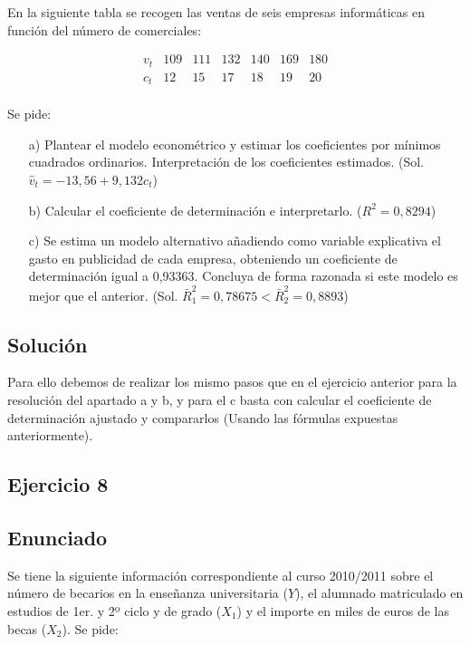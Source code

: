 \documentclass[a4paper,12pt]{article}
\begin{document}
En la siguiente tabla se recogen las ventas de seis empresas informáticas en función del número de comerciales:

\[
\begin{array}{c|cccccc}
v_t & 109 & 111 & 132 & 140 & 169 & 180 \\
\hline
c_t & 12 & 15 & 17 & 18 & 19 & 20 \\
\end{array}
\]



Se pide:

\begin{enumerate}
    \item[a)] Plantear el modelo econométrico y estimar los coeficientes por mínimos cuadrados ordinarios. Interpretación de los coeficientes estimados. (Sol. $\hat{v}_t = -13,56 + 9,132c_t$)
    \item[b)] Calcular el coeficiente de determinación e interpretarlo. ($R^2 = 0,8294$)
    \item[c)] Se estima un modelo alternativo añadiendo como variable explicativa el gasto en publicidad de cada empresa, obteniendo un coeficiente de determinación igual a 0,93363. Concluya de forma razonada si este modelo es mejor que el anterior. (Sol. $\bar{R}^2_1 = 0,78675 < \bar{R}^2_2 = 0,8893$)
\end{enumerate}

\subsection*{Solución}

Para ello debemos de realizar los mismo pasos que en el ejercicio anterior para la resolución del apartado a y b, y para el c basta con calcular el coeficiente de determinación ajustado y compararlos (Usando las fórmulas expuestas anteriormente).

\subsection{Ejercicio 8}

\subsection*{Enunciado}
Se tiene la siguiente información correspondiente al curso 2010/2011 sobre el número de becarios en la enseñanza universitaria (\(Y\)), el alumnado matriculado en estudios de 1er. y 2º ciclo y de grado (\(X_1\)) y el importe en miles de euros de las becas (\(X_2\)). Se pide:
\end{document}
